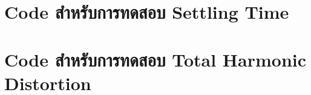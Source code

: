 \documentclass[a4paper, 11pt, oneside]{book} %
\begin{document}
\begin{singlespace}

\end{singlespace}

\section*{Code สำหรับการทดสอบ Settling Time}

\begin{singlespace}

\end{singlespace}

\section*{Code สำหรับการทดสอบ Total Harmonic Distortion}

\begin{singlespace}

\end{singlespace}



\end{document}
